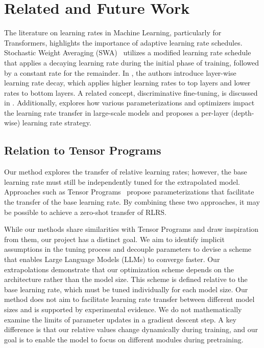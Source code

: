 \documentclass{article}
\theoremstyle{plain}
\theoremstyle{definition}
\theoremstyle{remark}
\begin{document}
    
    \section{Related and Future Work}
    
    The literature on learning rates in Machine Learning, particularly for Transformers, highlights the importance of adaptive learning rate schedules. Stochastic Weight Averaging (SWA)~\citep{izmailov2018averaging} utilizes a modified learning rate schedule that applies a decaying learning rate during the initial phase of training, followed by a constant rate for the remainder. 
    In \citet{sun2019fine}, the authors introduce layer-wise learning rate decay, which applies higher learning rates to top layers and lower rates to bottom layers. A related concept, discriminative fine-tuning, is discussed in \citet{howard2018universal}. Additionally, \citet{everett2024scaling} explores how various parameterizations and optimizers impact the learning rate transfer in large-scale models and proposes a per-layer (depth-wise) learning rate strategy.
    
    \subsection{Relation to Tensor Programs}
    \label{future:tensor_programs}
    
    Our method explores the transfer of relative learning rates; however, the base learning rate must still be independently tuned for the extrapolated model. Approaches such as Tensor Programs~\citep{yang2020tensor, yang2022tensor, everett2024scaling} propose parameterizations that facilitate the transfer of the base learning rate. By combining these two approaches, it may be possible to achieve a zero-shot transfer of RLRS. 
    
    While our methods share similarities with Tensor Programs and draw inspiration from them, our project has a distinct goal. We aim to identify implicit assumptions in the tuning process and decouple parameters to devise a scheme that enables Large Language Models (LLMs) to converge faster. Our extrapolations demonstrate that our optimization scheme depends on the architecture rather than the model size. This scheme is defined relative to the base learning rate, which must be tuned individually for each model size. Our method does not aim to facilitate learning rate transfer between different model sizes and is supported by experimental evidence. We do not mathematically examine the limits of parameter updates in a gradient descent step. A key difference is that our relative values change dynamically during training, and our goal is to enable the model to focus on different modules during pretraining.
    
\end{document}
